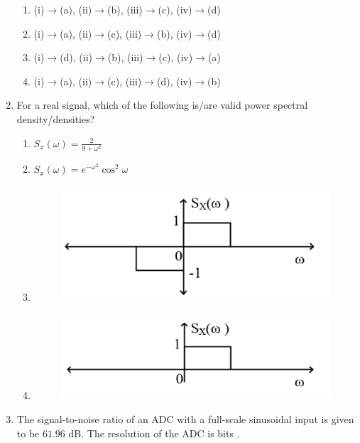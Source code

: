 \documentclass[a4paper, 11pt]{article}
\begin{document}
\begin{enumerate}
    \begin{enumerate}
        \item (i)$\rightarrow$(a), (ii)$\rightarrow$(b), (iii)$\rightarrow$(c), (iv)$\rightarrow$(d)
        \item (i)$\rightarrow$(a), (ii)$\rightarrow$(c), (iii)$\rightarrow$(b), (iv)$\rightarrow$(d)
        \item (i)$\rightarrow$(d), (ii)$\rightarrow$(b), (iii)$\rightarrow$(c), (iv)$\rightarrow$(a)
        \item (i)$\rightarrow$(a), (ii)$\rightarrow$(c), (iii)$\rightarrow$(d), (iv)$\rightarrow$(b)
    \end{enumerate}
    
    \hfill{}

    \item For a real signal, which of the following is/are valid power spectral density/densities?

    \begin{enumerate}
        \item $S_x(\omega) = \frac{2}{9+\omega^2}$
        \item $S_x(\omega) = e^{-\omega^2}\cos^2\omega$
        \item \begin{figure}[H] \centering \includegraphics[width=0.3\columnwidth]{figs/Q20C.png} \caption*{} \label{fig:q30c} \end{figure}
        \item \begin{figure}[H] \centering \includegraphics[width=0.3\columnwidth]{figs/Q20D.png} \caption*{} \label{fig:q30d} \end{figure}
    \end{enumerate}

    \hfill{}
    
    \item The signal-to-noise ratio  of an ADC with a full-scale sinusoidal input is given to be $61.96$ dB. The resolution of the ADC is \underline{\hspace{2cm}} bits .
    

\end{enumerate}
\end{document}
